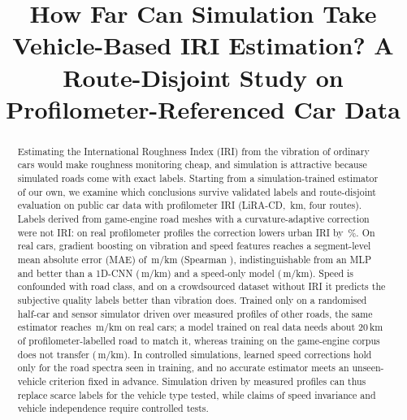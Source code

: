 \documentclass[conference]{IEEEtran}
\begin{document}
\title{How Far Can Simulation Take Vehicle-Based IRI Estimation? A Route-Disjoint Study on Profilometer-Referenced Car Data}

\author{
\and
{}
}

\maketitle

\begin{abstract}
Estimating the International Roughness Index (IRI) from the vibration of ordinary cars would make roughness monitoring cheap, and simulation is attractive because simulated roads come with exact labels.
Starting from a simulation-trained estimator of our own, we examine which conclusions survive validated labels and route-disjoint evaluation on public car data with profilometer IRI (LiRA-CD, \liraKm\,km, four routes).
Labels derived from game-engine road meshes with a curvature-adaptive correction were not IRI: on real profilometer profiles the correction lowers urban IRI by \legacyCorrUrbanMape\,\%.
On real cars, gradient boosting on vibration and speed features reaches a segment-level mean absolute error (MAE) of \liraGbmMae\,m/km (Spearman \liraGbmRho), indistinguishable from an MLP and better than a 1D-CNN (\liraCnnMae\,m/km) and a speed-only model (\liraSpeedMae\,m/km).
Speed is confounded with road class, and on a crowdsourced dataset without IRI it predicts the subjective quality labels better than vibration does.
Trained only on a randomised half-car and sensor simulator driven over measured profiles of other roads, the same estimator reaches \zsPsevenGbmMae\,m/km on real cars; a model trained on real data needs about 20\,km of profilometer-labelled road to match it, whereas training on the game-engine corpus does not transfer (\zsBngCorrGbmMae\,m/km).
In controlled simulations, learned speed corrections hold only for the road spectra seen in training, and no accurate estimator meets an unseen-vehicle criterion fixed in advance.
Simulation driven by measured profiles can thus replace scarce labels for the vehicle type tested, while claims of speed invariance and vehicle independence require controlled tests.
\end{abstract}
\end{document}
